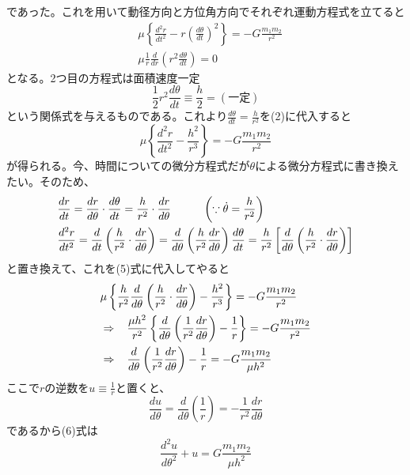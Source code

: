 \documentclass{jsarticle}
\begin{document}
であった。これを用いて動径方向と方位角方向でそれぞれ運動方程式を立てると
\begin{align}
&\mu\left\{\frac{d^{2}r}{dt^{2}}-r\left(\frac{d\theta}{dt}\right)^{2}\right\}=-G\frac{m_{1}m_{2}}{r^{2}}\\
&\mu\frac{1}{r}\frac{d}{dr}\left(r^{2}\frac{d\theta}{dt}\right)=0
\end{align}
となる。2つ目の方程式は面積速度一定
\begin{equation}
\displaystyle \frac{1}{2}r^{2}\frac{d\theta}{dt}\equiv\frac{h}{2}=(一定)
\end{equation}
という関係式を与えるものである。これより\(\displaystyle\frac{d\theta}{dt}=\frac{h}{r^{2}}\)を(2)に代入すると
\begin{equation}
\mu\left\{\frac{d^{2}r}{dt^{2}}-\frac{h^{2}}{r^{3}}\right\}=-G\frac{m_{1}m_{2}}{r^{2}}
\end{equation}
が得られる。今、時間についての微分方程式だが\(\theta\)による微分方程式に書き換えたい。そのため、
\begin{align*}
&\frac{dr}{dt}=\frac{dr}{d\theta}\cdot\frac{d\theta}{dt}=\frac{h}{r^2}\cdot\frac{dr}{d\theta}\hspace{10mm}\left(\because\dot{\theta}=\frac{h}{r^2}\right)\\
&\frac{d^{2}r}{dt^{2}}=\frac{d}{dt}\left(\frac{h}{r^2}\cdot\frac{dr}{d\theta}\right)=\frac{d}{d\theta}\left(\frac{h}{r^2}\frac{dr}{d\theta}\right)\frac{d\theta}{dt}=\frac{h}{r^2}\left[\frac{d}{d\theta}\left(\frac{h}{r^2}\cdot\frac{dr}{d\theta}\right)\right]
\end{align*}
と置き換えて、これを(5)式に代入してやると
\begin{align}
&\mu\left\{\frac{h}{r^2}\frac{d}{d\theta}\left(\frac{h}{r^2}\cdot\frac{dr}{d\theta}\right)-\frac{h^{2}}{r^{3}}\right\}=-G\frac{m_{1}m_{2}}{r^{2}}\nonumber\\
&\Rightarrow\hspace{3mm}\frac{\mu h^{2}}{r^{2}}\left\{\frac{d}{d\theta}\left(\frac{1}{r^{2}}\frac{dr}{d\theta}\right)-\frac{1}{r}\right\}=-G\frac{m_{1}m_{2}}{r^{2}}\nonumber\\
&\Rightarrow\hspace{3mm}\frac{d}{d\theta}\left(\frac{1}{r^{2}}\frac{dr}{d\theta}\right)-\frac{1}{r}=-G\frac{m_{1}m_{2}}{\mu h^{2}}
\end{align}
ここで\(r\)の逆数を\(\displaystyle u\equiv\frac{1}{r}\)と置くと、
\[\frac{du}{d\theta}=\frac{d}{d\theta}\left(\frac{1}{r}\right)=-\frac{1}{r^{2}}\frac{dr}{d\theta}\]
であるから(6)式は
\begin{equation}
\frac{d^{2}u}{d\theta^{2}}+u=G\frac{m_{1}m_{2}}{\mu h^{2}}
\end{equation}
\end{document}
